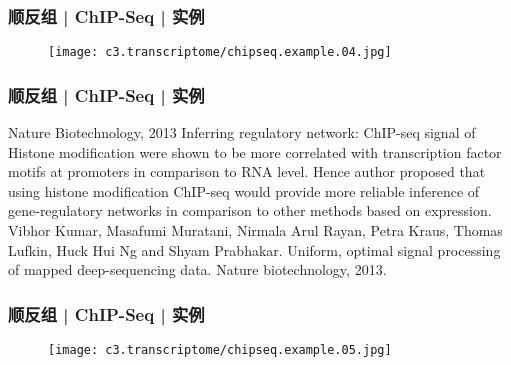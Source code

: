 \begin{frame}
  \frametitle{顺反组 | ChIP-Seq | 实例}
  \begin{figure}
    \centering
    \texttt{[image: c3.transcriptome/chipseq.example.04.jpg]}
  \end{figure}
\end{frame}

\begin{frame}
  \frametitle{顺反组 | ChIP-Seq | 实例}
  \begin{block}{Nature Biotechnology, 2013}
  Inferring regulatory network: ChIP-seq signal of Histone modification were shown to be more correlated with transcription factor motifs at promoters in comparison to RNA level. Hence author proposed that using histone modification ChIP-seq would provide more reliable inference of gene-regulatory networks in comparison to other methods based on expression.\\
  \vspace{0.5em}
  Vibhor Kumar, Masafumi Muratani, Nirmala Arul Rayan, Petra Kraus, Thomas Lufkin, Huck Hui Ng and Shyam Prabhakar. Uniform, optimal signal processing of mapped deep-sequencing data. Nature biotechnology, 2013.
  \end{block}
\end{frame}

\begin{frame}
  \frametitle{顺反组 | ChIP-Seq | 实例}
  \begin{figure}
    \centering
    \texttt{[image: c3.transcriptome/chipseq.example.05.jpg]}
  \end{figure}
\end{frame}

